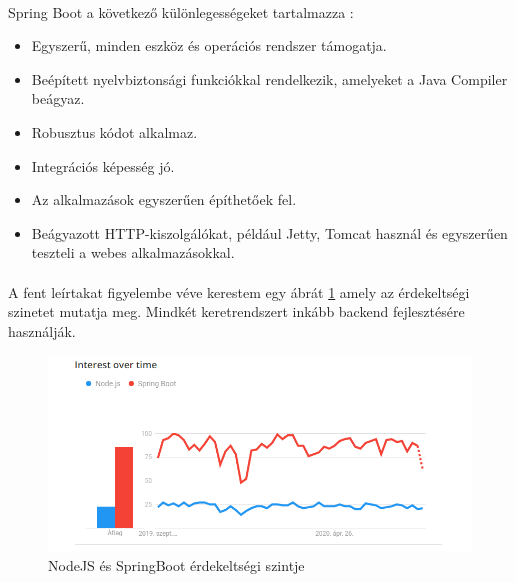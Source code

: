 	\paragraph{}
	Spring Boot a következő különlegességeket tartalmazza \cite{nodejsspring}:
	\begin{itemize}
		\item Egyszerű, minden eszköz és operációs rendszer támogatja.
		\item Beépített nyelvbiztonsági funkciókkal rendelkezik, amelyeket a Java Compiler beágyaz.
		\item Robusztus kódot alkalmaz.
		\item Integrációs képesség jó.
		\item Az alkalmazások egyszerűen építhetőek fel.
		\item Beágyazott HTTP-kiszolgálókat, például Jetty, Tomcat használ és egyszerűen teszteli a webes alkalmazásokkal.
	\end{itemize}
	
	\paragraph{}
	A fent leírtakat figyelembe véve kerestem egy ábrát \ref{nodespring} amely az érdekeltségi szinetet mutatja meg.\cite{nodejsspring1} Mindkét keretrendszert inkább backend fejlesztésére használják.
	
	\begin{figure}
		\centering
		\includegraphics[scale=0.6]{figures/images/nodespring.png}
		\caption{NodeJS és SpringBoot érdekeltségi szintje}
		\label{nodespring}
	\end{figure}